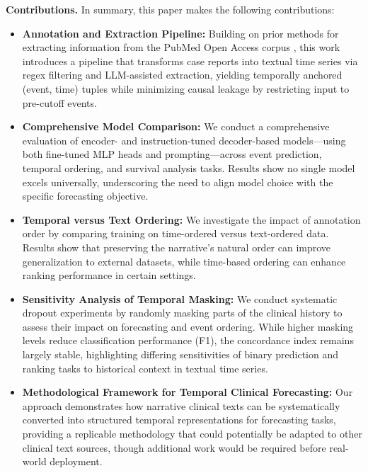 \textbf{Contributions.} In summary, this paper makes the following contributions:
\begin{itemize}[leftmargin=*,itemsep=0pt,parsep=0pt,partopsep=0pt,topsep=0pt]
    \item \textbf{Annotation and Extraction Pipeline:} Building on prior methods for extracting information from the PubMed Open Access corpus \cite{noroozizadeh2025reconstructing}, this work introduces a pipeline that transforms case reports into textual time series via regex filtering and LLM-assisted extraction, yielding temporally anchored (event, time) tuples while minimizing causal leakage by restricting input to pre-cutoff events.

    \item \textbf{Comprehensive Model Comparison:} 
    We conduct a comprehensive evaluation of encoder- and instruction-tuned decoder-based models—using both fine-tuned MLP heads and prompting—across event prediction, temporal ordering, and survival analysis tasks. Results show no single model excels universally, underscoring the need to align model choice with the specific forecasting objective.

    \item \textbf{Temporal versus Text Ordering:} 
    We investigate the impact of annotation order by comparing training on time-ordered versus text-ordered data. Results show that preserving the narrative’s natural order can improve generalization to external datasets, while time-based ordering can enhance ranking performance in certain settings.

    \item \textbf{Sensitivity Analysis of Temporal Masking:} 
    We conduct systematic dropout experiments by randomly masking parts of the clinical history to assess their impact on forecasting and event ordering. While higher masking levels reduce classification performance (F1), the concordance index remains largely stable, highlighting differing sensitivities of binary prediction and ranking tasks to historical context in textual time series.

    \item \textbf{Methodological Framework for Temporal Clinical Forecasting:} Our approach demonstrates how narrative clinical texts can be systematically converted into structured temporal representations for forecasting tasks, providing a replicable methodology that could potentially be adapted to other clinical text sources, though additional work would be required before real-world deployment.
\end{itemize}

